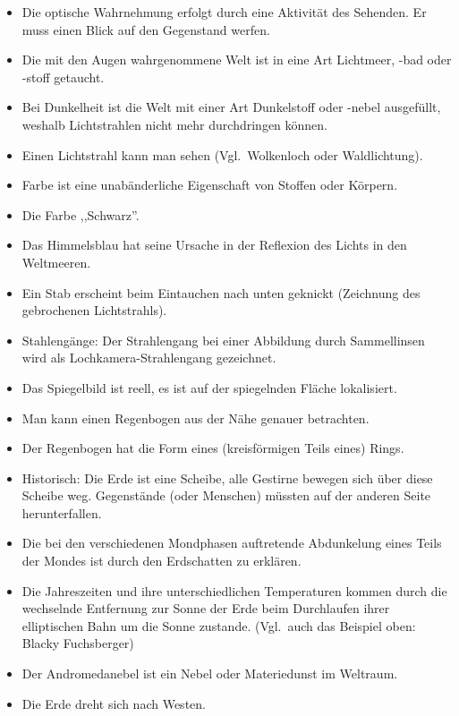 \begin{itemize}
\item
Die optische Wahrnehmung erfolgt durch eine Aktivit\"{a}t des
Sehenden. Er muss einen Blick auf den Gegenstand werfen.
\item
Die mit den Augen wahrgenommene Welt ist in eine Art Lichtmeer, -bad oder -stoff getaucht.
\item
Bei Dunkelheit ist die Welt mit einer Art Dunkelstoff oder -nebel ausgef\"{u}llt, weshalb Lichtstrahlen nicht mehr
durchdringen k\"{o}nnen.
\item
Einen Lichtstrahl kann man sehen (Vgl.\ Wolkenloch oder Waldlichtung).
\item
Farbe ist eine unab\"{a}nderliche Eigenschaft von Stoffen oder K\"{o}rpern.
\item
Die Farbe ,,Schwarz''.
\item
Das Himmelsblau hat seine Ursache in der Reflexion des Lichts in den Weltmeeren.
\item
Ein Stab erscheint beim Eintauchen nach unten geknickt (Zeichnung des gebrochenen Lichtstrahls).
\item
Stahleng\"{a}nge: Der Strahlengang bei einer Abbildung durch Sammellinsen wird als Lochkamera-Strahlengang gezeichnet.

\item
Das Spiegelbild ist reell, es ist auf der spiegelnden Fl\"{a}che lokalisiert.

\item
Man kann einen Regenbogen aus der N\"{a}he genauer betrachten.

\item Der Regenbogen hat die Form eines (kreisf\"{o}rmigen Teils eines) Rings.
\end{itemize}

\begin{itemize}
\item
Historisch: Die Erde ist eine Scheibe, alle Gestirne bewegen
sich \"{u}ber diese Scheibe weg. Gegenst\"{a}nde (oder Menschen) m\"{u}ssten
auf der anderen Seite herunterfallen.
\item
Die bei den verschiedenen Mondphasen auftretende Abdunkelung
eines Teils der Mondes ist durch den Erdschatten zu erkl\"{a}ren.
\item
Die Jahreszeiten und ihre unterschiedlichen Temperaturen kommen
durch die wechselnde Entfernung zur Sonne der Erde beim
Durchlaufen ihrer elliptischen Bahn um die Sonne zustande.
(Vgl.\ auch das Beispiel oben: Blacky  Fuchsberger)

\item
Der Andromedanebel ist ein Nebel oder Materiedunst im Weltraum.
\item
Die Erde dreht sich nach Westen.
\end{itemize}

